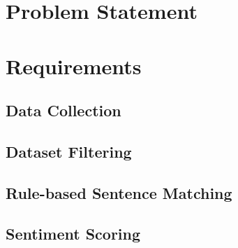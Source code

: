 \documentclass{report}
\begin{document}
\section{Problem Statement}


\section{Requirements}



\subsection{Data Collection}  %




\subsection{Dataset Filtering}

\subsection{Rule-based Sentence Matching}

\subsection{Sentiment Scoring}

\end{document}
